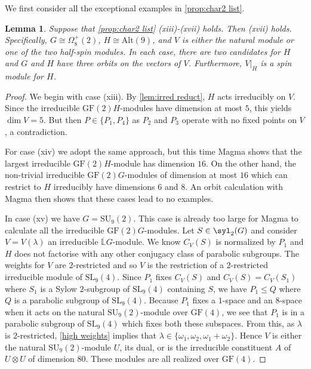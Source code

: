 \documentclass[12pt]{amsart}
\newtheorem{lemma}[theorem]{Lemma}
\theoremstyle{remark}
\theoremstyle{notation}
\theoremstyle{definition}
\newcommand{\SU}{\mathrm{SU}}
\newcommand{\GF}{\mathrm{GF}}
\newcommand{\SL}{\mathrm{SL}}
\newcommand{\0}{\emptyset}
\newcommand{\Alt}{\mathrm{Alt}}
\begin{document}
We first consider all the exceptional examples  in \cref{prop:char2 list}.


\begin{lemma}\label{odd balls}
Suppose that  \cref{prop:char2 list} (xiii)-(xvii) holds. Then  (xvii) holds. Specifically, $G \cong \Omega_8^+ (2)$, $H \cong \Alt(9)$, and $V$ is either the natural module or one of the two half-spin modules. In each case, there are two candidates for $H$ and $G$ and $H$ have three orbits on the vectors of $V$.  Furthermore, $V|_H$ is a  spin module for $H$.
\end{lemma}

\begin{proof}
We begin with case (xiii). By \cref{lem:irred reduct}, $H$ acts irreducibly on $V$. Since the irreducible $\GF(2)H$-modules have dimension at most $5$, this yields $\dim V=5$. But then $P\in \{P_1,P_4\}$ as $P_2$ and $P_3$ operate with no fixed points on $V$, a contradiction.

For case (xiv) we adopt the same approach, but this time {\sc Magma} shows that the largest irreducible $\GF(2)H$-module has dimension $16$.  On the other hand,   the non-trivial irreducible $\GF(2)G$-modules of dimension at most $16$   which can restrict to $H$ irreducibly  have dimensions $6$ and $8$. An orbit calculation with {\sc Magma} then shows that these cases lead to no examples.


In case (xv) we have $G= \SU_9(2)$. This case is already too large for {\sc Magma} to calculate all the irreducible $\GF(2)G$-modules. Let $S \in \syl_2(G)$ and consider $V= V(\lambda)$ an irreducible $\overline{\mathbb L}G$-module. We know $C_V(S)$ is normalized by $P_1$ and $H$ does not factorise with any other conjugacy class of parabolic subgroups. The weights for $V$ are $2$-restricted and so $V$ is the restriction of a $2$-restricted irreducible module of $\SL_9(4)$. Since $P_1$ fixes $C_V(S)$ and $C_V(S)= C_V(S_1)$ where $S_1$ is a Sylow $2$-subgroup of $\SL_9(4)$ containing $S$, we have $P_1 \le Q$ where $Q$ is a parabolic subgroup of $\SL_9(4)$.  Because $P_1$ fixes a $1$-space and an $8$-space when it acts on the natural $\SU_9(2)$-module over $\GF(4)$, we see that $P_1$ is in a parabolic subgroup of $\SL_9(4)$ which fixes both these subspaces.  From this, as $\lambda$ is $2$-restricted, \cref{high weights} implies that  $\lambda\in \{ \omega_1, \omega_2,\omega_1+\omega_2\}$. Hence $V$ is either the natural $\SU_9(2)$-module $U$, its dual, or is the irreducible  constituent $A$ of $U\otimes U$ of dimension $80$.  These modules are all realized over $\GF(4)$.


\end{proof}
\end{document}
